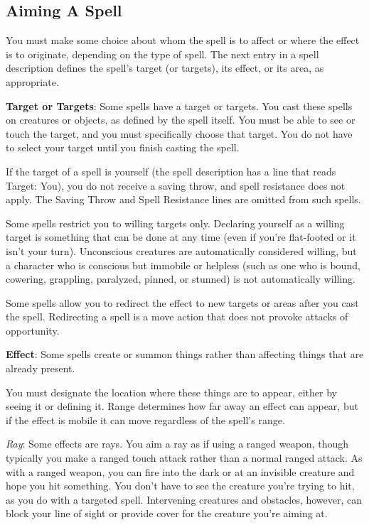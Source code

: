 \subsection{Aiming A Spell}
You must make some choice about whom the spell is to affect or where the effect is to originate, depending on the type of spell. The next entry in a spell description defines the spell's target (or targets), its effect, or its area, as appropriate.

\textbf{Target or Targets}: Some spells have a target or targets. You cast these spells on creatures or objects, as defined by the spell itself. You must be able to see or touch the target, and you must specifically choose that target. You do not have to select your target until you finish casting the spell.

If the target of a spell is yourself (the spell description has a line that reads Target: You), you do not receive a saving throw, and spell resistance does not apply. The Saving Throw and Spell Resistance lines are omitted from such spells.

Some spells restrict you to willing targets only. Declaring yourself as a willing target is something that can be done at any time (even if you're flat-footed or it isn't your turn). Unconscious creatures are automatically considered willing, but a character who is conscious but immobile or helpless (such as one who is bound, cowering, grappling, paralyzed, pinned, or stunned) is not automatically willing.

Some spells allow you to redirect the effect to new targets or areas after you cast the spell. Redirecting a spell is a move action that does not provoke attacks of opportunity.

\textbf{Effect}: Some spells create or summon things rather than affecting things that are already present.

You must designate the location where these things are to appear, either by seeing it or defining it. Range determines how far away an effect can appear, but if the effect is mobile it can move regardless of the spell's range.

\textit{Ray}: Some effects are rays. You aim a ray as if using a ranged weapon, though typically you make a ranged touch attack rather than a normal ranged attack. As with a ranged weapon, you can fire into the dark or at an invisible creature and hope you hit something. You don't have to see the creature you're trying to hit, as you do with a targeted spell. Intervening creatures and obstacles, however, can block your line of sight or provide cover for the creature you're aiming at.

